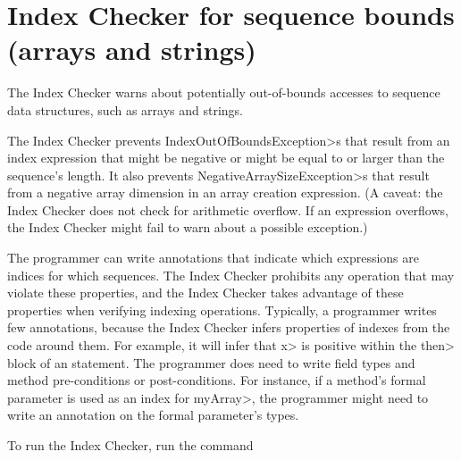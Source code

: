 \chapter{Index Checker for sequence bounds (arrays and strings)\label{index-checker}}

The Index Checker warns about potentially out-of-bounds accesses to sequence
data structures, such as arrays
and strings.

The Index Checker prevents \<IndexOutOfBoundsException>s that result from
an index expression that might be negative or might be equal to or larger
than the sequence's length.
It also prevents \<NegativeArraySizeException>s that result from a negative
array dimension in an array creation expression.
(A caveat:  the Index Checker does not check for arithmetic overflow.  If
an expression overflows, the Index Checker might fail to warn about a
possible exception.)

%

The programmer can write annotations that indicate which expressions are
indices for which sequences.  The Index Checker prohibits any operation that
may violate these properties, and the Index Checker takes advantage of
these properties when verifying indexing operations.
%
Typically, a programmer writes few annotations, because the Index Checker
infers properties of indexes from
the code around them. For example, it will infer that \<x> is positive
within the \<then> block of an  statement.
The programmer does need to write field types and method pre-conditions or post-conditions. For instance,
if a method's formal parameter is used as an index for
\<myArray>, the programmer might need to
write an 
annotation on the formal parameter's types.

To run the Index Checker, run the command

